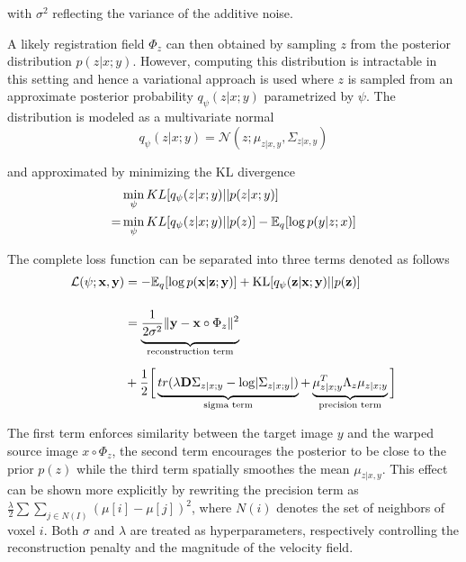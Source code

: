 with $\sigma^2$ reflecting the variance of the additive noise.

A likely registration field $\Phi_z$ can then obtained by sampling $z$ from the posterior distribution $p(z | x; y)$.
However, computing this distribution is intractable in this setting and hence a variational approach is used where $z$ is sampled from an approximate posterior probability $q_\psi(z | x; y)$ parametrized by $\psi$. The distribution is modeled as a multivariate normal
\begin{equation}
	q_\psi(z | x; y) = \mathcal{N}(z; \mu_{z | x, y}, \Sigma_{z | x, y})
\end{equation}

and approximated by minimizing the KL divergence
\begin{equation}
	\begin{split}
		  &\min_\psi KL [ q_\psi(z | x; y) || p(z | x; y) ] \\
		= &\min_\psi KL [ q_\psi(z | x; y) || p(z) ] - \mathbb{E}_q [ \log p(y | z; x) ]
	\end{split}
\end{equation}

The complete loss function can be separated into three terms denoted as follows
\begin{equation} \label{eq:voxloss}
	\begin{split}
		\mathcal{L}(\psi; \mathbf{x}, \mathbf{y})
		& = -\E_{q}[ \log p( \mathbf{x} | \mathbf{z}; \mathbf{y} ) ]
		+ \text{KL} [ q_{\psi} ( \mathbf{z} | \mathbf{x} ; \mathbf{y} ) || p ( \mathbf{z} ) ] \\[12pt]
		& = \underbrace{
			\frac{1}{2 \sigma^2} \norm{\mathbf{y} - \mathbf{x} \circ \Phi_{z}}^{2} \vphantom{\frac{1}{2_{2_2}}}
		}_{\text{reconstruction term}} \\[6pt]
		& + \frac{1}{2} \bigg[
		\underbrace{
			tr( \lambda \mathbf{D} \Sigma_{z | x; y} - \log \abs{ \Sigma_{z | x; y} } ) \vphantom{\mu_{z | x; y}^{T}}
		}_{\text{sigma term}} +
		\underbrace{
			\mu_{z | x; y}^{T} \Lambda_{z} \mu_{z | x; y}
		}_{\text{precision term}} \bigg]
	\end{split}
\end{equation}

The first term enforces similarity between the target image $y$ and the warped source image $x \circ \Phi_z$, the second term encourages the posterior to be close to the prior $p(z)$ while the third term spatially smoothes the mean $\mu_{z | x, y}$. This effect can be shown more explicitly by rewriting the precision term as $ { \frac{\lambda}{2} \sum \sum_{j \in N(I)} ( \mu[i] - \mu[j])^{2} } $, where $N(i)$ denotes the set of neighbors of voxel $i$. Both $\sigma$ and $\lambda$ are treated as hyperparameters, respectively controlling the reconstruction penalty and the magnitude of the velocity field.

